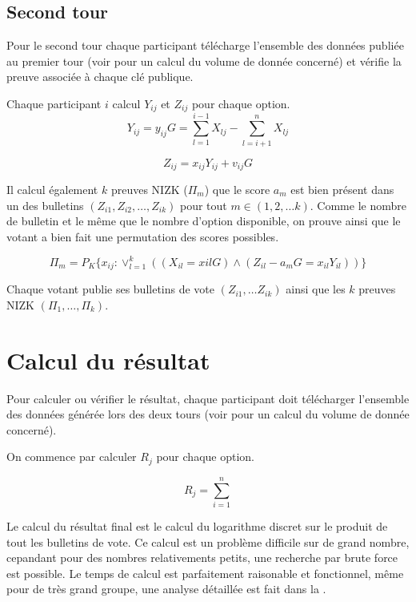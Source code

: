 \documentclass[../report]{subfiles}
\begin{document}
\subsection{Second tour}

Pour le second tour chaque participant télécharge l'ensemble des données publiée au premier 
tour (voir  pour un calcul du volume de donnée concerné) et vérifie la
preuve associée à chaque clé publique.

Chaque participant $i$ calcul $Y_{ij}$ et $Z_{ij}$ pour chaque option.
\[
	Y_{ij} = y_{ij} G = \sum_{l=1}^{i-1} X_{lj} - \sum_{l=i+1}^{n} X_{lj}
\]

\[
	Z_{ij} = x_{ij} Y_{ij} + v_{ij} G
\]

Il calcul également $k$ preuves NIZK ($\Pi_m$) que le score $a_{m}$ est bien présent dans un des bulletins 
$(Z_{i1}, Z_{i2}, \dots, Z_{ik})$ pour tout $m \in (1, 2, \dots k)$.
Comme le nombre de bulletin et le même que le nombre d'option disponible, on prouve ainsi
que le votant a bien fait une permutation des scores possibles.

\[
\Pi_m = P_K\{x_{ij}: \vee_{l=1}^{k} ((X_{il} = x{il} G) \wedge (Z_{il} - a_{m}G = x_{il} Y_{il}) )\}
\]

Chaque votant publie ses bulletins de vote $(Z_{i1}, \dots Z_{ik})$ ainsi que les $k$ preuves NIZK $(\Pi_1, \dots, \Pi_k)$.


\section{Calcul du résultat}\label{sec:res:proto:resultat}

Pour calculer ou vérifier le résultat, chaque participant doit télécharger l'ensemble des données générée lors des 
deux tours (voir  pour un calcul du volume de donnée concerné).

On commence par calculer $R_j$ pour chaque option.

\[
	R_j = \sum_{i=1}^{n}
\]

Le calcul du résultat final est le calcul du logarithme discret sur le produit de tout les 
bulletins de vote.
Ce calcul est un problème difficile sur de grand nombre, cepandant pour des nombres 
relativements petits, une recherche par brute force est possible.
Le temps de calcul est parfaitement raisonable et fonctionnel, même pour de très grand groupe, 
une analyse détaillée est fait dans la .
\end{document}
